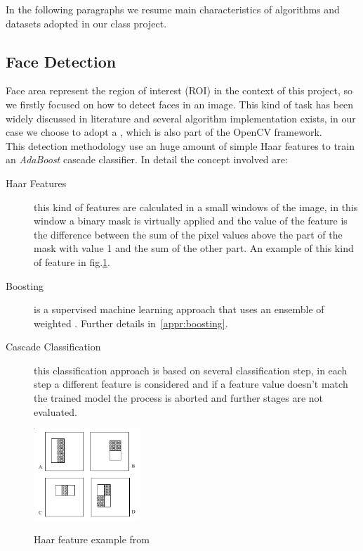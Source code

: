 In the following paragraphs we resume main characteristics of algorithms and datasets adopted in our class project.


\subsection{Face Detection}

Face area represent the region of interest (ROI) in the context of this project, so we firstly focused on how to detect faces in an image. This kind of task has been widely discussed in literature and several algorithm implementation exists, in our case we choose to adopt a \cite{Viola01rapidobject}, which is also part of the OpenCV framework.\\
This detection methodology use an huge amount of simple Haar features to train an \emph{AdaBoost} cascade classifier. In detail the concept involved are:

\begin{description}
\item[Haar Features] this kind of features are calculated in a small windows of the image, in this window a binary mask is virtually applied and the value of the feature is the difference between the sum of the pixel values above the part of the mask with value 1 and the sum of the other part. An example of this kind of feature in fig.\ref{fig:haar}.
\item[Boosting] is a supervised machine learning approach that uses an ensemble of weighted . Further details in~\ref{appr:boosting}.
\item[Cascade Classification] this classification approach is based on several classification step, in each step a different feature is considered and if a feature value doesn't match the trained model the process is aborted and further stages are not evaluated.
\end{description}

\begin{figure}[!h]
\centering
\includegraphics[width=4cm]{images/haarfeatures.png}
\label{fig:haar}
\caption{Haar feature example from \cite{Viola01rapidobject} }
\end{figure}


